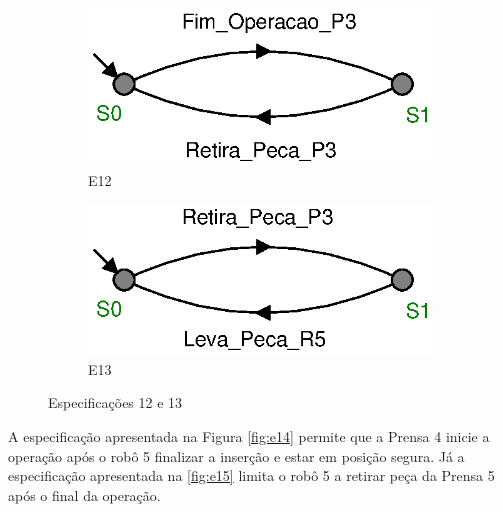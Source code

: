 \begin{figure}[H]%
  \centering
  \begin{subfigure}{0.45\textwidth}
      \centering
      \includegraphics[width=\textwidth]{imagens/E12.eps}
      \caption{E12}
      \label{fig:e12}
  \end{subfigure}
  \hfill
  \begin{subfigure}{0.45\textwidth}
      \centering
      \includegraphics[width=\textwidth]{imagens/E13.eps}
      \caption{E13}
      \label{fig:e13}
  \end{subfigure}
  \caption{Especificações 12 e 13}
  \label{fig:e1213}
\end{figure}

A especificação apresentada na Figura \ref{fig:e14} permite que a Prensa 4 inicie a operação após o robô 5 finalizar a inserção e estar em posição segura.
Já a especificação apresentada na \ref{fig:e15} limita o robô 5 a retirar peça da Prensa 5 após o final da operação.

